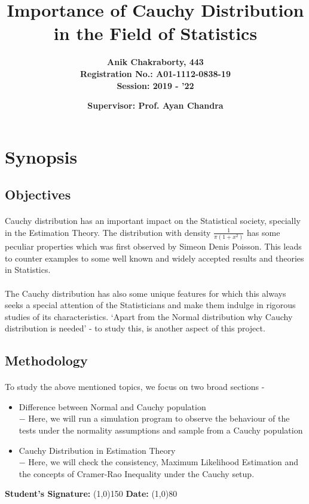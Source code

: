 \documentclass[12pt]{article}
\title{\color[HTML]{09447a}\textbf{Importance of Cauchy Distribution \\ in the Field of Statistics}}
\author{\textbf{Anik Chakraborty, 443}\\ \textbf{Registration No.: A01-1112-0838-19} \\ \textbf{Session: 2019 - '22}}
\date{\textbf{Supervisor: Prof. Ayan Chandra}}
\begin{document}
	\maketitle

	\color[HTML]{1a5c8f}\section*{Synopsis}
	\color[HTML]{1a76bd}\subsection*{Objectives}
	\paragraph{} \color{black} Cauchy distribution has an important impact on the Statistical society, specially in the Estimation Theory. The distribution with density $ \frac{1}{\pi(1+x^2)} $ has some peculiar properties which was first observed by Simeon Denis Poisson. This leads to counter examples to some well known and widely accepted results and theories in Statistics. 
	\paragraph{} The Cauchy distribution has also some unique features for which this always seeks a special attention of the Statisticians and make them indulge in rigorous studies of its characteristics. `Apart from the Normal distribution why Cauchy distribution is needed' - to study this, is another aspect of this project. 
	
	\color[HTML]{1a76bd}\subsection*{Methodology}
	\paragraph{} \color{black} To study the above mentioned topics, we focus on two broad sections - 
	\begin{itemize}
		\item Difference between Normal and Cauchy population \\ [5pt] $-$ Here, we will run a simulation program to observe the behaviour of the tests under the normality assumptions and sample from a Cauchy population
		\item Cauchy Distribution in Estimation Theory \\ [5pt] $-$ Here, we will check the consistency, Maximum Likelihood Estimation and the concepts of Cramer-Rao Inequality under the Cauchy setup.
	\end{itemize}
\vspace{28pt}
\textbf{Student's Signature:} \line(1,0){150} \hfill \textbf{Date:} \line(1,0){80}
\end{document}
